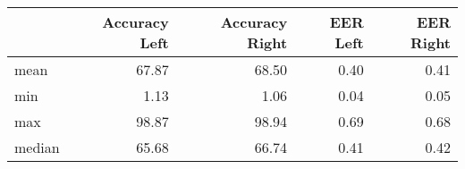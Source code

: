 \begin{tabular}{lrrrr}
\toprule
{} &  Accuracy Left &  Accuracy Right &  EER Left &  EER Right \\
\midrule
mean   &          67.87 &           68.50 &      0.40 &       0.41 \\
min    &           1.13 &            1.06 &      0.04 &       0.05 \\
max    &          98.87 &           98.94 &      0.69 &       0.68 \\
median &          65.68 &           66.74 &      0.41 &       0.42 \\
\bottomrule
\end{tabular}
